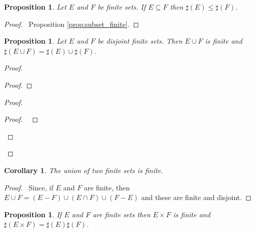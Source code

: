 \documentclass{report}
\let\qed\relax
\newtheorem{prop}[ax]{Proposition}
\newtheorem{cor}{Corollary}[ax]
\theoremstyle{definition}
\begin{document}
\begin{prop}
Let $E$ and $F$ be finite sets. If $E \subseteq F$ then $\sharp(E) \leq \sharp(F)$.
\end{prop}

\begin{proof}
\pf\ Proposition \ref{prop:subset_finite}. \qed
\end{proof}

\begin{prop}
\label{prop:size_of_union}
Let $E$ and $F$ be disjoint finite sets. Then $E \cup F$ is finite and $\sharp(E \cup F) = \sharp(E) \cup \sharp(F)$.
\end{prop}

\begin{proof}
\pf
{}
\begin{proof}
\end{proof}
\begin{proof}
	\begin{proof}
		\pf\ 
	\end{proof}
\end{proof}
\qed
\end{proof}

\begin{cor}
\label{cor:union_finite}
The union of two finite sets is finite.
\end{cor}

\begin{proof}
\pf\ Since, if $E$ and $F$ are finite, then $E \cup F = (E - F) \cup (E \cap F) \cup (F - E)$ and these are finite and disjoint. \qed
\end{proof}

\begin{prop}
\label{prop:size_product}
If $E$ and $F$ are finite sets then $E \times F$ is finite and $\sharp(E \times F) = \sharp(E) \sharp(F)$.
\end{prop}
\end{document}
